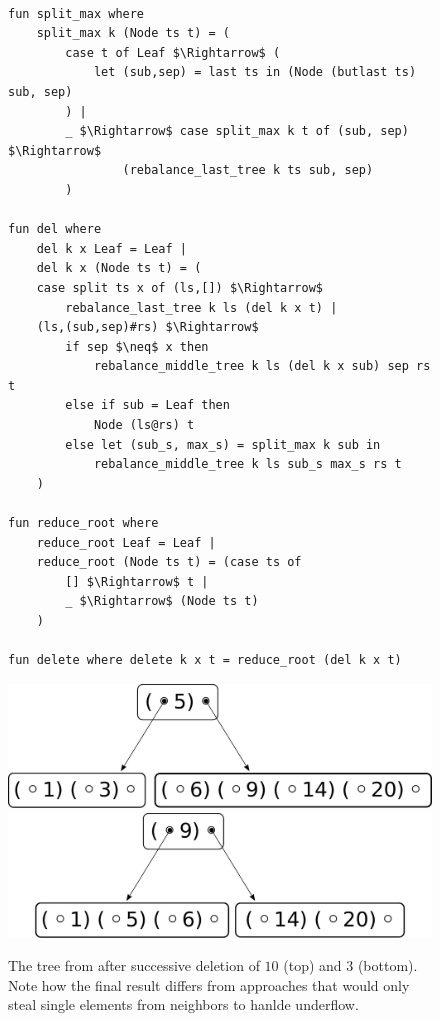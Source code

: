 \begin{figure}
\begin{lstlisting}[mathescape=true, language=Isabelle,label={lst:del-def},
    caption={The $delete$ function}]

fun split_max where
    split_max k (Node ts t) = (
        case t of Leaf $\Rightarrow$ (
            let (sub,sep) = last ts in (Node (butlast ts) sub, sep)
        ) |
        _ $\Rightarrow$ case split_max k t of (sub, sep) $\Rightarrow$
                (rebalance_last_tree k ts sub, sep)
        )

fun del where
    del k x Leaf = Leaf |
    del k x (Node ts t) = (
    case split ts x of (ls,[]) $\Rightarrow$
        rebalance_last_tree k ls (del k x t) |
    (ls,(sub,sep)#rs) $\Rightarrow$
        if sep $\neq$ x then
            rebalance_middle_tree k ls (del k x sub) sep rs t
        else if sub = Leaf then
            Node (ls@rs) t
        else let (sub_s, max_s) = split_max k sub in
            rebalance_middle_tree k ls sub_s max_s rs t
    )
 
fun reduce_root where
    reduce_root Leaf = Leaf |
    reduce_root (Node ts t) = (case ts of
        [] $\Rightarrow$ t |
        _ $\Rightarrow$ (Node ts t)
    )
 
fun delete where delete k x t = reduce_root (del k x t)
\end{lstlisting}
\end{figure}

\begin{figure}
    \centering
    \includegraphics[width=0.48\linewidth]{figures/btree-basic-ins9-ins1-del10.pdf}\\
    \vspace*{1cm}
    \includegraphics[width=0.48\linewidth]{figures/btree-basic-ins9-ins1-del10-del3.pdf}
    \caption[An example B-Tree after two deletion operations]{The tree from  after 
    successive deletion of $10$ (top) and $3$ (bottom).
    Note how the final result differs from approaches that would only steal single elements
    from neighbors to hanlde underflow.}
    \label{fig:btree-basic-del}
\end{figure}

